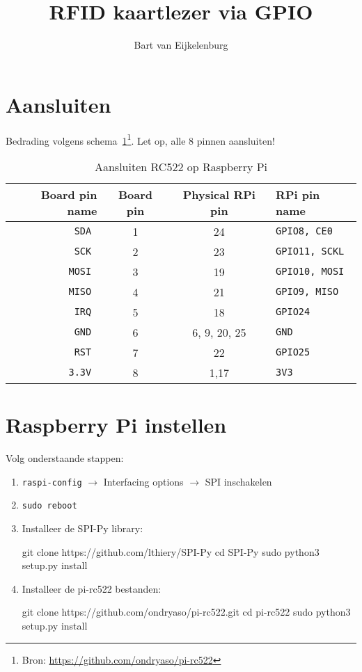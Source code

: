 \documentclass{guide}
\title{RFID kaartlezer via GPIO}
\author{Bart van Eijkelenburg}
\begin{document}
\section{Aansluiten}
Bedrading volgens schema~\ref{tab:pins}\footnote{Bron: \url{https://github.com/ondryaso/pi-rc522}}. Let op, alle 8 pinnen aansluiten!

\begin{table}[h]
  \centering
  \begin{tabular}{|r|c|c|l|}
    \hline
    \bf Board pin name & \bf Board pin & \bf Physical RPi pin & \bf RPi pin name \\
    \hline
      \tt SDA & 1 & 24 & \tt GPIO8, CE0 \\
    \hline
      \tt SCK & 2 & 23 & \tt GPIO11, SCKL \\
    \hline
      \tt MOSI & 3 & 19 & \tt GPIO10, MOSI \\
    \hline
      \tt MISO & 4 & 21 & \tt GPIO9, MISO \\
    \hline
      \tt IRQ & 5 & 18 & \tt GPIO24 \\
    \hline
      \tt GND & 6 & 6, 9, 20, 25 & \tt GND \\
    \hline
      \tt RST & 7 & 22 & \tt GPIO25 \\
    \hline
      \tt 3.3V & 8 & 1,17 & \tt 3V3 \\
    \hline
  \end{tabular}
  \caption{Aansluiten RC522 op Raspberry Pi}\label{tab:pins}
\end{table}

\section{Raspberry Pi instellen}
Volg onderstaande stappen:

  \begin{enumerate}
    \item \texttt{raspi-config} $\to$ Interfacing options $\to$ SPI inschakelen
    \item \texttt{sudo reboot}
    \item Installeer de SPI-Py library:
      \begin{bash}
git clone https://github.com/lthiery/SPI-Py
cd SPI-Py
sudo python3 setup.py install
      \end{bash}

    \item Installeer de pi-rc522 bestanden:
      \begin{bash}
git clone https://github.com/ondryaso/pi-rc522.git
cd pi-rc522
sudo python3 setup.py install
      \end{bash}
  \end{enumerate}
\end{document}
